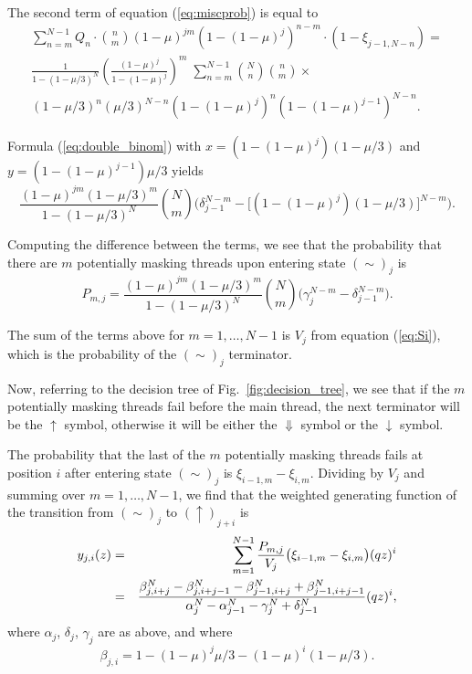 \documentclass{article}
\begin{document}
The second term of equation (\ref{eq:miscprob}) is equal to
\begin{multline*}
\sum_{n=m}^{N-1} Q_n \cdot {n \choose m} (1-\mu)^{jm} (1-(1-\mu)^j)^{n-m}
\cdot (1 - \xi_{j-1,N-n}) = \\
\frac{1}{1-(1-\mu/3)^N}
\left(\frac{(1-\mu)^j}{1-(1-\mu)^j}\right)^m
\; \sum_{n=m}^{N-1} {N \choose n} {n \choose m} \times \\
(1-\mu/3)^n (\mu/3)^{N-n}
(1-(1-\mu)^j)^n (1-(1-\mu)^{j-1})^{N-n}.
\end{multline*}

Formula (\ref{eq:double_binom}) with $x=(1-(1-\mu)^j)(1-\mu/3)$ and
$y = (1-(1-\mu)^{j-1})\mu/3$ yields
\begin{equation*}
\frac{(1-\mu)^{jm} (1-\mu/3)^m}{1-(1-\mu/3)^N} {N \choose m}
\bigg( \delta_{j-1}^{N-m}
-\big[ (1-(1-\mu)^j)(1-\mu/3)\big]^{N-m} \bigg).
\end{equation*}

Computing the difference between the terms, we see that the probability
that there are $m$ potentially masking threads upon entering state
$(\sim)_j$ is
\begin{equation*}
P_{m,j} = \frac{(1-\mu)^{jm} (1-\mu/3)^m}{1-(1-\mu/3)^N} {N \choose m} 
\big( \gamma_j^{N-m} - \delta_{j-1}^{N-m} \big).
\end{equation*}


The sum of the terms above for $m = 1, \ldots, N-1$ is $V_j$ from equation
(\ref{eq:Si}), which is the probability of the $(\sim)_j$ terminator.

Now, referring to the decision tree of Fig.~\ref{fig:decision_tree}, we
see that if the $m$ potentially masking threads fail before the main
thread, the next terminator will be the $\uparrow$ symbol, otherwise it
will be either the $\Downarrow$ symbol or the $\downarrow$ symbol.

The probability that the last of the $m$ potentially masking threads fails
at position $i$ after entering state $(\sim)_j$ is
$\xi_{i-1,m}-\xi_{i,m}$. Dividing by $V_j$ and summing over $m = 1,
\ldots, N-1$, we find that the weighted generating function of the
transition from $(\sim)_j$ to $(\uparrow)_{j+i}$ is
\begin{eqnarray}
y_{j,i}(z) &=& \sum_{m=1}^{N-1} \frac{P_{m,j}}{V_j}
\big( \xi_{i-1,m}-\xi_{i,m} \big) (qz)^i \notag \\
&=& \frac{\beta_{j,i+j}^N - \beta_{j,i+j-1}^N
-\beta_{j-1,i+j}^N + \beta_{j-1,i+j-1}^N}
  {\alpha_j^N-\alpha_{j-1}^N-\gamma_j^N+\delta_{j-1}^N} (qz)^i,
\end{eqnarray}
where $\alpha_j$, $\delta_j$, $\gamma_j$ are as above, and where
\begin{equation}
\beta_{j,i} = 1 - (1-\mu)^j\mu/3 - (1-\mu)^i(1-\mu/3).
\end{equation}
\end{document}
